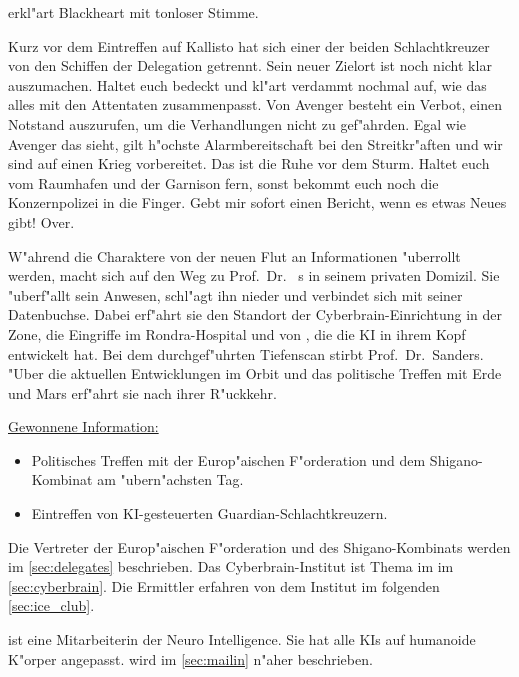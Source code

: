 erkl"art Blackheart mit tonloser Stimme. 

\begin{speech}
	Kurz vor dem Eintreffen auf Kallisto hat sich einer der beiden Schlachtkreuzer von den Schiffen der Delegation getrennt. Sein neuer Zielort ist noch nicht klar auszumachen. Haltet euch bedeckt und kl"art verdammt nochmal auf, wie das alles mit den Attentaten zusammenpasst. Von Avenger besteht ein Verbot, einen Notstand auszurufen, um die Verhandlungen nicht zu gef"ahrden. Egal wie Avenger das sieht, gilt h"ochste Alarmbereitschaft bei den Streitkr"aften und wir sind auf einen Krieg vorbereitet. Das ist die Ruhe vor dem Sturm. Haltet euch vom Raumhafen und der Garnison fern, sonst bekommt euch noch die Konzernpolizei in die Finger. Gebt mir sofort einen Bericht, wenn es etwas Neues gibt! Over.
\end{speech}


W"ahrend die Charaktere von der neuen Flut an Informationen "uberrollt werden, macht sich \xl{} auf den Weg zu Prof.~Dr.~	s in seinem privaten Domizil. Sie "uberf"allt sein Anwesen, schl"agt ihn nieder und verbindet sich mit seiner Datenbuchse. Dabei erf"ahrt sie den Standort der Cyberbrain-Einrichtung in der Zone, die Eingriffe im Rondra-Hospital und von \ml{}, die die KI in ihrem Kopf entwickelt hat. Bei dem durchgef"uhrten Tiefenscan stirbt Prof.~Dr.~Sanders. "Uber die aktuellen Entwicklungen im Orbit und das politische Treffen mit Erde und Mars erf"ahrt sie nach ihrer R"uckkehr.

\begin{remarks}
	\underline{Gewonnene Information:}
	
	\begin{itemize}
		\item Politisches Treffen mit der Europ"aischen F"orderation und dem Shigano-Kombinat am "ubern"achsten Tag.
		\item Eintreffen von KI-gesteuerten Guardian-Schlachtkreuzern.
	\end{itemize}

	Die Vertreter der Europ"aischen F"orderation und des Shigano-Kombinats werden im \cref{sec:delegates} beschrieben.
	Das Cyberbrain-Institut ist Thema im im \cref{sec:cyberbrain}. Die Ermittler erfahren von dem Institut im folgenden 
	\cref{sec:ice_club}.

	\ml{} ist eine Mitarbeiterin der Neuro Intelligence. Sie hat alle KIs auf humanoide K"orper angepasst. \ml{} wird im
	\cref{sec:mailin} n"aher beschrieben.
\end{remarks}
